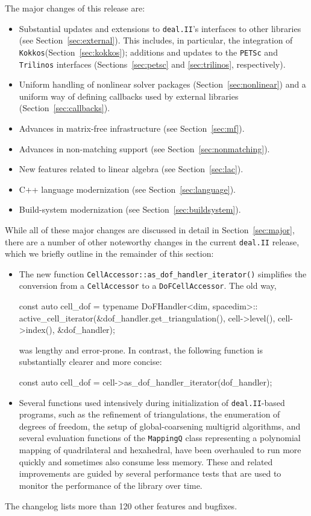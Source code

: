 \documentclass{ansarticle-preprint}
\newcommand{\specialword}[1]{\texttt{#1}}
\newcommand{\dealii}{{\specialword{deal.II}}\xspace}
\newcommand{\trilinos}{{\specialword{Trilinos}}\xspace}
\newcommand{\petsc}{\specialword{PETSc}\xspace}
\newcommand{\kokkos}{{\specialword{Kokkos}}\xspace}
\begin{document}
The major changes of this release are:
%
\begin{itemize}
  \item Substantial updates and extensions to \dealii{}'s interfaces
    to other libraries (see Section~\ref{sec:external}). This
    includes, in particular, the integration of \kokkos (Section~\ref{sec:kokkos});
    additions and updates to the \petsc and \trilinos
    interfaces
    (Sections~\ref{sec:petsc} and \ref{sec:trilinos}, respectively).
  \item Uniform handling of nonlinear solver
  packages (Section~\ref{sec:nonlinear}) and a uniform
    way of defining callbacks used by external libraries (Section~\ref{sec:callbacks}).
  \item Advances in matrix-free infrastructure (see Section~\ref{sec:mf}).
  \item Advances in non-matching support (see Section~\ref{sec:nonmatching}).
  \item New features related to linear algebra (see Section~\ref{sec:lac}).
  \item C++ language modernization (see Section~\ref{sec:language}).
  \item Build-system modernization (see Section~\ref{sec:buildsystem}).
\end{itemize}
%

While all of these major changes are discussed in detail in
Section~\ref{sec:major}, there
are a number of other noteworthy changes in the current \dealii release,
which we briefly outline in the remainder of this section:
%
\begin{itemize}
  \item The new function \texttt{CellAccessor::as\_dof\_handler\_iterator()}
  simplifies the conversion from a \texttt{Cell\-Accessor} to a \texttt{DoF\-Cell\-Accessor}.
  The old way,
\begin{c++}
const auto cell_dof = typename DoFHandler<dim, spacedim>::
  active_cell_iterator(&dof_handler.get_triangulation(),
    cell->level(), cell->index(), &dof_handler);
\end{c++}
was lengthy and error-prone. In contrast, the following function is
substantially clearer and more concise:
\begin{c++}
const auto cell_dof = cell->as_dof_handler_iterator(dof_handler);
\end{c++}
\item Several functions used intensively during initialization of
  \dealii-based programs, such as the refinement of triangulations, the
  enumeration of degrees of freedom, the setup of global-coarsening multigrid
  algorithms, and several evaluation functions of the \texttt{MappingQ} class
  representing a polynomial mapping of quadrilateral and hexahedral, have been
  overhauled to run more quickly and sometimes also consume less memory. These
  and related improvements are guided by several performance tests that are
  used to monitor the performance of the library over time.
\end{itemize}
%
The changelog lists more than 120 other features and bugfixes.
\end{document}
